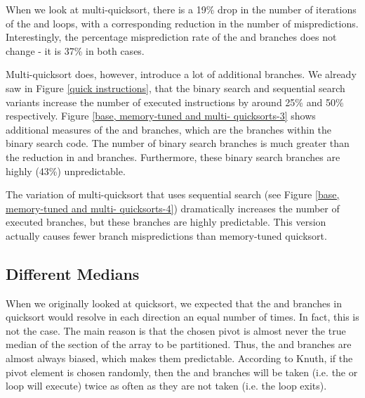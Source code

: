 When we look at multi-quicksort, there is a 19\% drop in the number of
iterations of the  and  loops, with a corresponding reduction in the
number of mispredictions. Interestingly, the percentage misprediction rate of
the  and  branches does not change - it is 37\% in both cases.

Multi-quicksort does, however, introduce a lot of additional branches. We
already saw in Figure \ref{quick instructions}, that the binary search and
sequential search variants increase the number of executed instructions by
around 25\% and 50\% respectively. Figure \ref{base, memory-tuned and multi-
quicksorts-3} shows additional measures of the  and  branches, which are the branches within the binary search code. The
number of binary search branches is much greater than the reduction in 
and  branches. Furthermore, these binary search branches are highly (43\%)
unpredictable.

The variation of multi-quicksort that uses sequential search (see Figure
\ref{base, memory-tuned and multi- quicksorts-4}) dramatically increases the
number of executed branches, but these branches are highly predictable. This
version actually causes fewer branch mispredictions than memory-tuned quicksort.

\subsection{Different Medians}

\label{quick-predictors2}

\label{quicksort entropy}
When we originally looked at quicksort, we expected that the  and 
branches in quicksort would resolve in each direction an equal number of times.
In fact, this is not the case. The main reason is that the chosen pivot is
almost never the true median of the section of the array to be partitioned.
Thus, the  and  branches are almost always biased, which makes them
predictable. According to Knuth, if the pivot element is chosen randomly, then
the  and  branches will be taken (i.e. the  or  loop will
execute) twice as often as they are not taken (i.e. the loop exits).

